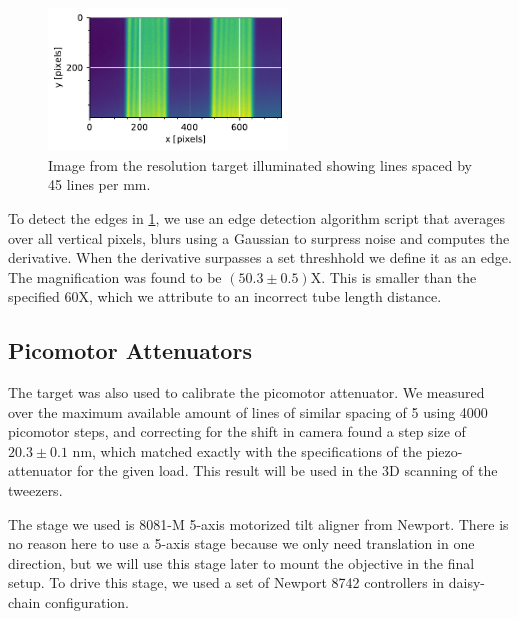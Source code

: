 \begin{figure}
    \centering
    \includegraphics[width = 2.5in]{figures/linespacing.pdf}
    \caption{Image from the resolution target illuminated showing lines spaced by 45 lines per mm.}
    \label{fig:resolutionTarget}
\end{figure}

To detect the edges in \cref{fig:resolutionTarget}, we use an edge detection algorithm script that averages over all vertical pixels, blurs using a Gaussian to surpress noise and computes the derivative. When the derivative surpasses a set threshhold we define it as an edge. The magnification was found to be $(50.3\pm0.5)$X. This is smaller than the specified 60X, which we attribute to an incorrect tube length distance. 

\subsection{Picomotor Attenuators}

The target was also used to calibrate the picomotor attenuator. We measured over the maximum available amount of lines of similar spacing of 5 using 4000 picomotor steps, and correcting for the shift in camera found a step size of $20.3\pm0.1$ nm, which matched exactly with the specifications of the piezo-attenuator for the given load. This result will be used in the 3D scanning of the tweezers. 

The stage we used is 8081-M 5-axis motorized tilt aligner from Newport. There is no reason here to use a 5-axis stage because we only need translation in one direction, but we will use this stage later to mount the objective in the final setup. To drive this stage, we used a set of Newport 8742 controllers in daisy-chain configuration. 



